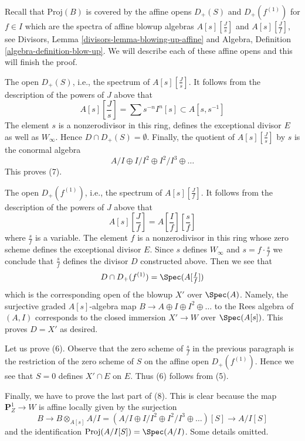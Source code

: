\medskip\noindent
Recall that $\text{Proj}(B)$ is covered by the affine opens
$D_+(S)$ and $D_+(f^{(1)})$ for $f \in I$ which are
the spectra of affine blowup algebras $A[s][\frac{J}{s}]$
and $A[s][\frac{J}{f}]$, see
Divisors, Lemma \ref{divisors-lemma-blowing-up-affine} and
Algebra, Definition \ref{algebra-definition-blow-up}.
We will describe each of these affine opens and this will finish the
proof.

\medskip\noindent
The open $D_+(S)$, i.e., the spectrum of $A[s][\frac{J}{s}]$.
It follows from the description of the powers of $J$ above
that
$$
A[s][\textstyle{\frac{J}{s}}] = \sum s^{-n}I^n[s] \subset A[s, s^{-1}]
$$
The element $s$ is a nonzerodivisor in this ring, defines the exceptional
divisor $E$ as well as $W_\infty$. Hence $D \cap D_+(S) = \emptyset$.
Finally, the quotient of $A[s][\frac{J}{s}]$ by $s$ is the conormal algebra
$$
A/I \oplus I/I^2 \oplus I^2/I^3 \oplus \ldots
$$
This proves (7).

\medskip\noindent
The open $D_+(f^{(1)})$, i.e., the spectrum of $A[s][\frac{J}{f}]$.
It follows from the description of the powers of $J$ above that
$$
A[s][\textstyle{\frac{J}{f}}] =
A[\textstyle{\frac{I}{f}}][\textstyle{\frac{s}{f}}]
$$
where $\frac{s}{f}$ is a variable. The element $f$ is a nonzerodivisor
in this ring whose zero scheme defines the exceptional divisor $E$.
Since $s$ defines $W_\infty$ and $s = f \cdot \frac{s}{f}$
we conclude that $\frac{s}{f}$ defines
the divisor $D$ constructed above. Then we see that
$$
D \cap D_+(f^{(1)}) = \Spec(A[\textstyle{\frac{I}{f}}])
$$
which is the corresponding open of the blowup $X'$ over $\Spec(A)$.
Namely, the surjective graded $A[s]$-algebra map
$B \to A \oplus I \oplus I^2 \oplus \ldots$
to the Rees algebra of $(A, I)$ corresponds to the closed
immersion $X' \to W$ over $\Spec(A[s])$.
This proves $D = X'$ as desired.

\medskip\noindent
Let us prove (6). Observe that the zero scheme of $\frac{s}{f}$
in the previous paragraph is the restriction of the zero scheme of $S$
on the affine open $D_+(f^{(1)})$. Hence we see that $S = 0$ defines
$X' \cap E$ on $E$. Thus (6) follows from (5).

\medskip\noindent
Finally, we have to prove the last part of (8). This is clear
because the map $\mathbf{P}^1_Z \to W$ is affine locally
given by the surjection
$$
B \to B \otimes_{A[s]} A/I =
(A/I \oplus I/I^2 \oplus I^2/I^3 \oplus \ldots)[S] \to
A/I[S]
$$
and the identification $\text{Proj}(A/I[S]) = \Spec(A/I)$.
Some details omitted.






